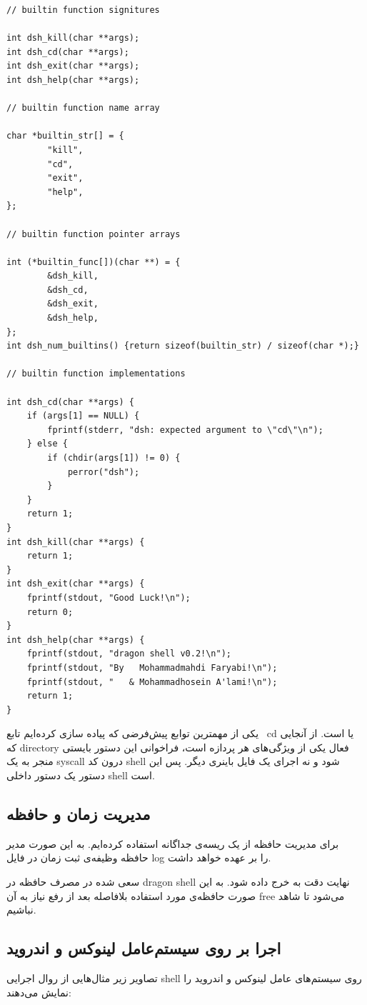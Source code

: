 \documentclass{article}
\begin{document}
\begin{latin}
\begin{verbatim}
// builtin function signitures

int dsh_kill(char **args);
int dsh_cd(char **args);
int dsh_exit(char **args);
int dsh_help(char **args);

// builtin function name array

char *builtin_str[] = {
        "kill",
        "cd",
        "exit",
        "help",
};

// builtin function pointer arrays

int (*builtin_func[])(char **) = {
        &dsh_kill,
        &dsh_cd,
        &dsh_exit,
        &dsh_help,
};
int dsh_num_builtins() {return sizeof(builtin_str) / sizeof(char *);}

// builtin function implementations

int dsh_cd(char **args) {
    if (args[1] == NULL) {
        fprintf(stderr, "dsh: expected argument to \"cd\"\n");
    } else {
        if (chdir(args[1]) != 0) {
            perror("dsh");
        }
    }
    return 1;
}
int dsh_kill(char **args) {
    return 1;
}
int dsh_exit(char **args) {
    fprintf(stdout, "Good Luck!\n");
    return 0;
}
int dsh_help(char **args) {
    fprintf(stdout, "dragon shell v0.2!\n");
    fprintf(stdout, "By   Mohammadmahdi Faryabi!\n");
    fprintf(stdout, "   & Mohammadhosein A'lami!\n");
    return 1;
}
\end{verbatim}	
\end{latin}

یکی از مهمترین توابع پیش‌فرضی که پیاده سازی کرده‌ایم تابع  cd یا
است. از آنجایی که directory فعال یکی از ویژگی‌های هر پردازه‌ است، فراخوانی این دستور بایستی منجر به یک syscall درون کد shell شود و نه اجرای یک فایل باینری دیگر. پس این دستور یک دستور داخلی shell است.

\subsection{مدیریت زمان و حافظه}
برای مدیریت حافظه از یک ریسه‌ی جداگانه استفاده کرده‌ایم. به این صورت مدیر حافظه وظیفه‌ی ثبت زمان در فایل log را بر عهده خواهد داشت.
 
سعی شده در مصرف حافظه‌ در dragon shell نهایت دقت به خرج داده شود. به این صورت حافظه‌ی مورد استفاده بلافاصله بعد از رفع نیاز به آن free می‌شود تا شاهد  نباشیم.

\subsection{اجرا بر روی سیستم‌عامل لینوکس و اندروید}
تصاویر زیر مثال‌هایی از روال اجرایی shell روی سیستم‌های عامل لینوکس و اندروید را نمایش می‌دهند:
\end{document}
